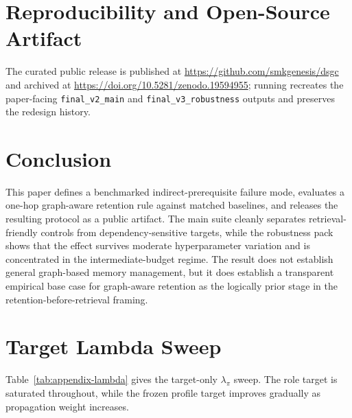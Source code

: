 \documentclass[10pt]{article}
\begin{document}
\section{Reproducibility and Open-Source Artifact}

The curated public release is published at \url{https://github.com/smkgenesis/dsgc} and archived at \url{https://doi.org/10.5281/zenodo.19594955}; running  recreates the paper-facing \texttt{final\_v2\_main} and \texttt{final\_v3\_robustness} outputs and preserves the redesign history.

\section{Conclusion}

This paper defines a benchmarked indirect-prerequisite failure mode, evaluates a one-hop graph-aware retention rule against matched baselines, and releases the resulting protocol as a public artifact. The main suite cleanly separates retrieval-friendly controls from dependency-sensitive targets, while the robustness pack shows that the effect survives moderate hyperparameter variation and is concentrated in the intermediate-budget regime. The result does not establish general graph-based memory management, but it does establish a transparent empirical base case for graph-aware retention as the logically prior stage in the retention-before-retrieval framing.

\begingroup
\small


\endgroup

\appendix
\small

\section{Target Lambda Sweep}

Table~\ref{tab:appendix-lambda} gives the target-only $\lambda_\pi$ sweep. The
role target is saturated throughout, while the frozen profile target improves
gradually as propagation weight increases.
\end{document}
